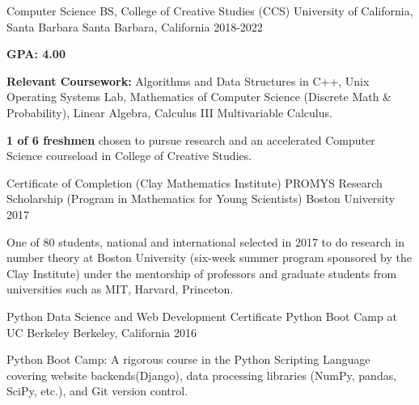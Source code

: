 
\begin{cventries}

  \cventry
  {Computer Science BS, College of Creative Studies (CCS)} %
    {University of California, Santa Barbara} %
    {Santa Barbara, California} %
    {2018-2022} %
    {
    \begin{cvitems}
    \item \textbf{GPA: 4.00} 
    \item \textbf{Relevant Coursework:} Algorithms and Data Structures in C++, Unix Operating Systems Lab, Mathematics of Computer Science (Discrete Math \& Probability), Linear Algebra, Calculus III Multivariable Calculus.
    \item \textbf{1 of 6 freshmen} chosen to pursue research and an accelerated Computer Science courseload in College of Creative Studies.
    \end{cvitems}
    }


    \cventry
    {Certificate of Completion (Clay Mathematics Institute)} %
    {PROMYS Research Scholarship (Program in Mathematics for Young Scientists)} %
    {Boston University} %
    {2017} %
    {
    \begin{cvitems}
    \item One of 80 students, national and international selected in 2017 to do research in number theory at Boston University (six-week summer program sponsored by the Clay Institute) under the mentorship of professors and graduate students from universities such as MIT, Harvard, Princeton.
    \end{cvitems}
    }


 \cventry
    {Python Data Science and Web Development Certificate} %
    {Python Boot Camp at UC Berkeley} %
    {Berkeley, California} %
    {2016} %
    {
      \begin{cvitems}
      \item Python Boot Camp: A rigorous course in the Python Scripting Language covering website backends(Django), data processing libraries (NumPy, pandas, SciPy, etc.), and Git version control.
      \end{cvitems}
      }


\end{cventries}

